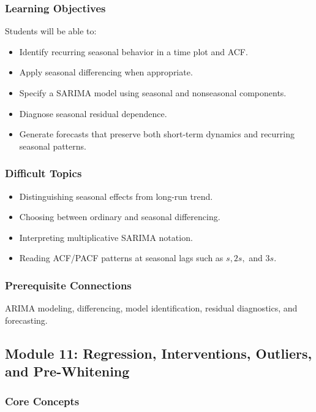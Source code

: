 \documentclass[11pt]{article}
\begin{document}
\subsubsection{Learning Objectives}

Students will be able to:

\begin{itemize}
    \item Identify recurring seasonal behavior in a time plot and ACF.
    \item Apply seasonal differencing when appropriate.
    \item Specify a SARIMA model using seasonal and nonseasonal components.
    \item Diagnose seasonal residual dependence.
    \item Generate forecasts that preserve both short-term dynamics and
    recurring seasonal patterns.
\end{itemize}

\subsubsection{Difficult Topics}

\begin{itemize}
    \item Distinguishing seasonal effects from long-run trend.
    \item Choosing between ordinary and seasonal differencing.
    \item Interpreting multiplicative SARIMA notation.
    \item Reading ACF/PACF patterns at seasonal lags such as \(s, 2s,\) and
    \(3s\).
\end{itemize}

\subsubsection{Prerequisite Connections}

ARIMA modeling, differencing, model identification, residual diagnostics, and
forecasting.

\subsection{Module 11: Regression, Interventions, Outliers, and Pre-Whitening}

\subsubsection{Core Concepts}
\end{document}

